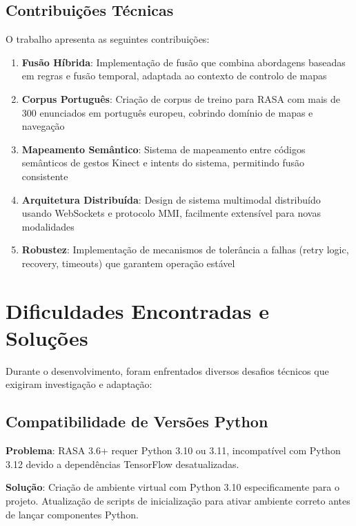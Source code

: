 \documentclass{report}
\begin{document}
\subsection{Contribuições Técnicas}

O trabalho apresenta as seguintes contribuições:

\begin{enumerate}
    \item \textbf{Fusão Híbrida}: Implementação de fusão que combina abordagens baseadas em regras e fusão temporal, adaptada ao contexto de controlo de mapas

    \item \textbf{Corpus Português}: Criação de corpus de treino para RASA com mais de 300 enunciados em português europeu, cobrindo domínio de mapas e navegação

    \item \textbf{Mapeamento Semântico}: Sistema de mapeamento entre códigos semânticos de gestos Kinect e intents do sistema, permitindo fusão consistente

    \item \textbf{Arquitetura Distribuída}: Design de sistema multimodal distribuído usando WebSockets e protocolo MMI, facilmente extensível para novas modalidades

    \item \textbf{Robustez}: Implementação de mecanismos de tolerância a falhas (retry logic, recovery, timeouts) que garantem operação estável
\end{enumerate}

\section{Dificuldades Encontradas e Soluções}

Durante o desenvolvimento, foram enfrentados diversos desafios técnicos que exigiram investigação e adaptação:

\subsection{Compatibilidade de Versões Python}

\textbf{Problema}: RASA 3.6+ requer Python 3.10 ou 3.11, incompatível com Python 3.12 devido a dependências TensorFlow desatualizadas.

\textbf{Solução}: Criação de ambiente virtual com Python 3.10 especificamente para o projeto. Atualização de scripts de inicialização para ativar ambiente correto antes de lançar componentes Python.
\end{document}
